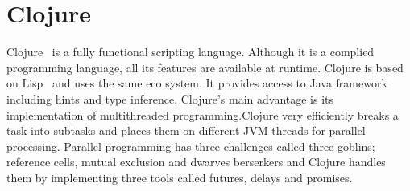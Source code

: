 \section{Clojure}

Clojure~\cite{hid-sp18-413-clojure} is a fully functional scripting
language. Although it is a complied programming language, all its features are
available at runtime. Clojure is based on Lisp~\cite{hid-sp18-413-lisp} and
uses the same eco system. It provides access to Java framework including hints
and type inference. Clojure's main advantage is its implementation of
multithreaded programming.Clojure very efficiently breaks a task into subtasks
and places them on different JVM threads for parallel processing. Parallel
programming has three challenges called three goblins; reference cells, mutual
exclusion and dwarves berserkers and Clojure handles them by implementing three
tools called futures, delays and promises.
